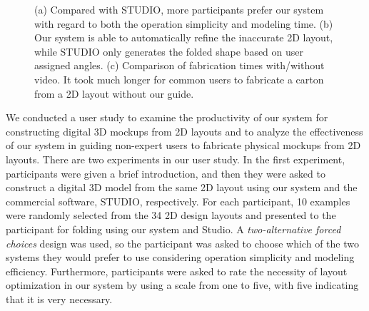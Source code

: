  
 
 \begin{figure}  
 	\centering
 	\vspace{2ex}
 	\vspace{2ex}
 	\caption{(a) Compared with STUDIO, more participants prefer our system with regard to both the operation simplicity and modeling time. (b) Our system is able to automatically refine the inaccurate 2D layout, while STUDIO only generates the folded shape based on user assigned angles. (c) Comparison of fabrication times with/without video. It took much longer for common users to fabricate a carton from a 2D layout without our guide.}
 	\label{fig:userstudy}
 \end{figure}
 
 
 
We conducted a user study to examine the productivity of our system for constructing digital 3D mockups from 2D layouts and to analyze the effectiveness of our system in guiding non-expert users to fabricate physical mockups from 2D layouts. 
%
There are two experiments in our user study.
% 
In the first experiment, participants were given a brief introduction, and then they were asked to construct a digital 3D model from the same 2D layout using our system and the commercial software, STUDIO, respectively.
For each participant, 10 examples were randomly selected from the 34 2D design layouts and presented to the participant for folding using our system and Studio.
A \emph{two-alternative forced choices} design was used, so the participant was asked to choose which of the two systems they would prefer to use considering operation simplicity and modeling efficiency. 
%
Furthermore, participants were asked to rate the necessity of layout optimization in our system by using a scale from one to five, with five indicating that it is very necessary.

